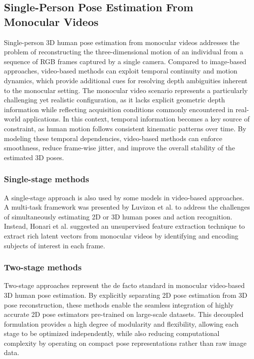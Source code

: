 \subsection{Single-Person Pose Estimation From Monocular Videos}
Single-person 3D human pose estimation from monocular videos addresses the problem of reconstructing the three-dimensional motion of an individual from a sequence of RGB frames captured by a single camera. Compared to image-based 
approaches, video-based methods can exploit temporal continuity and motion dynamics, which provide additional cues for resolving depth ambiguities inherent to the monocular setting.
The monocular video scenario represents a particularly challenging yet realistic configuration, as it lacks explicit geometric depth information while reflecting acquisition conditions commonly encountered in real-world applications. 
In this context, temporal information becomes a key source of constraint, as human motion follows consistent kinematic patterns over time. By modeling these temporal dependencies, video-based methods can enforce smoothness, reduce 
frame-wise jitter, and improve the overall stability of the estimated 3D poses.

\subsubsection{Single-stage methods}
A single-stage approach is also used by some models in video-based approaches. A multi-task framework was presented by Luvizon et al. \cite{luvizon2020multi} to address the challenges of simultaneously estimating 2D or 3D human poses 
and action recognition. Instead, Honari et al. \cite{honari2022temporal} suggested an unsupervised feature extraction technique to extract rich latent vectors from monocular videos by identifying and encoding subjects of interest in 
each frame.

\subsubsection{Two-stage methods}
Two-stage approaches represent the de facto standard in monocular video-based 3D human pose estimation. By explicitly separating 2D pose estimation from 3D pose reconstruction, these methods enable the seamless integration of highly 
accurate 2D pose estimators pre-trained on large-scale datasets. This decoupled formulation provides a high degree of modularity and flexibility, allowing each stage to be optimized independently, while also reducing computational 
complexity by operating on compact pose representations rather than raw image data.

